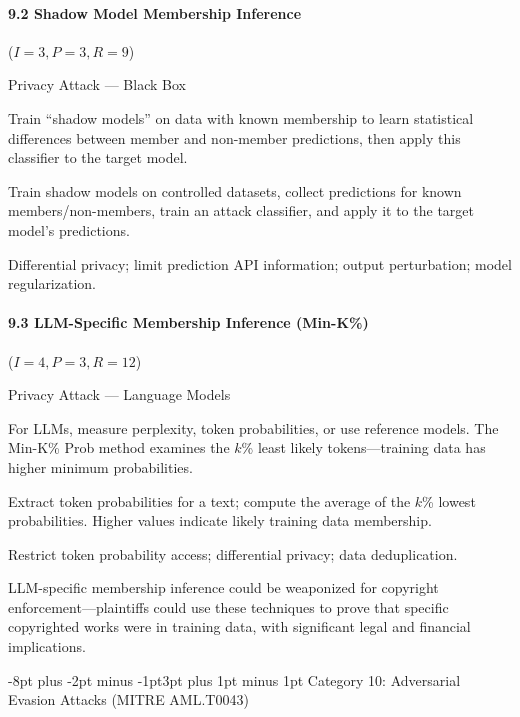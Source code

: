 \documentclass[conference]{IEEEtran}
\makeatletter
\renewcommand{\subsection}{\@startsection{subsection}{2}{\z@}%
  {-8pt plus -2pt minus -1pt}{3pt plus 1pt minus 1pt}%
  {\normalfont\normalsize\bfseries\sffamily\color{accentblue}}}
\newenvironment{attackentry}{\begin{description}[style=unboxed,leftmargin=0cm,itemsep=1pt,parsep=1pt,topsep=2pt,font=\sffamily\small\color{accentdark}]}{\end{description}}
\makeatother
\begin{document}
\paragraph{9.2 Shadow Model Membership Inference} ($I{=}3, P{=}3, R{=}9$)
\begin{attackentry}
\item[Category:] Privacy Attack --- Black Box
\item[How it works:] Train ``shadow models'' on data with known membership to learn statistical differences between member and non-member predictions, then apply this classifier to the target model.
\item[Example:] Train shadow models on controlled datasets, collect predictions for known members/non-members, train an attack classifier, and apply it to the target model's predictions.
\item[Mitigations:] Differential privacy; limit prediction API information; output perturbation; model regularization.
\end{attackentry}

\paragraph{9.3 LLM-Specific Membership Inference (Min-K\%)} ($I{=}4, P{=}3, R{=}12$)
\begin{attackentry}
\item[Category:] Privacy Attack --- Language Models
\item[How it works:] For LLMs, measure perplexity, token probabilities, or use reference models. The Min-K\% Prob method examines the $k$\% least likely tokens---training data has higher minimum probabilities.
\item[Example:] Extract token probabilities for a text; compute the average of the $k$\% lowest probabilities. Higher values indicate likely training data membership.
\item[Mitigations:] Restrict token probability access; differential privacy; data deduplication.
\item[Novel Inference (Hypothesized):] LLM-specific membership inference could be weaponized for copyright enforcement---plaintiffs could use these techniques to prove that specific copyrighted works were in training data, with significant legal and financial implications.
\end{attackentry}

\subsection{Category 10: Adversarial Evasion Attacks (MITRE AML.T0043)}
\end{document}
